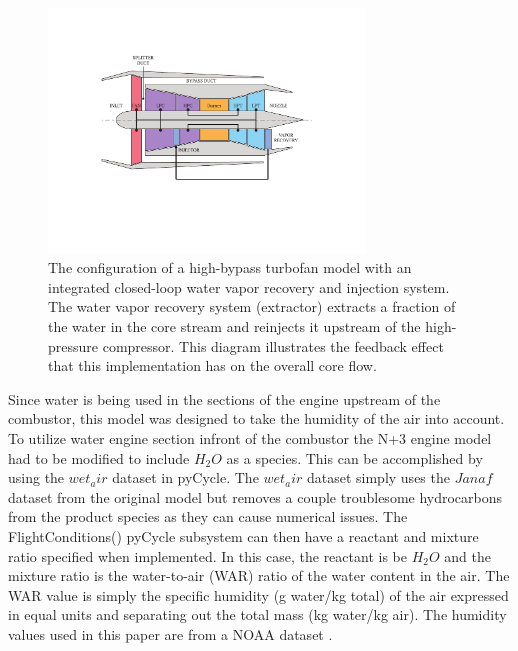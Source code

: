 \documentclass[conf]{new-aiaa}
\begin{document}
\begin{figure}[hbt!]
    \centering
    \includegraphics[width=0.75\textwidth]{turbofan_wvr.pdf}
    \caption{
        The configuration of a high-bypass turbofan model with an integrated closed-loop water vapor recovery and injection system.
        The water vapor recovery system (extractor) extracts a fraction of the water in the core stream and reinjects it upstream of the high-pressure compressor.
        This diagram illustrates the feedback effect that this implementation has on the overall core flow.}
    \label{fig:n3_cycle}
\end{figure}

Since water is being used in the sections of the engine upstream of the combustor, this model was designed to take the humidity of the air into account.
To utilize water engine section infront of the combustor the N+3 engine model had to be modified to include $H_2O$ as a species.
This can be accomplished by using the $wet_air$ dataset in pyCycle.
The $wet_air$ dataset simply uses the $Janaf$ dataset from the original model but removes a couple troublesome hydrocarbons from the product species as they can cause numerical issues.
The FlightConditions() pyCycle subsystem can then have a reactant and mixture ratio specified when implemented.
In this case, the reactant is be $H_2O$ and the mixture ratio is the water-to-air (WAR) ratio of the water content in the air.
The WAR value is simply the specific humidity (g water/kg total) of the air expressed in equal units and separating out the total mass (kg water/kg air).
The humidity values used in this paper are from a NOAA dataset \cite{Kalnay1996}.
\end{document}
